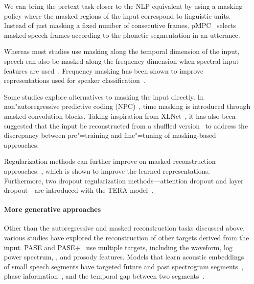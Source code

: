 We can bring the pretext task closer to the NLP equivalent by using a masking policy where the masked regions of the input correspond to linguistic units. Instead of just masking a fixed number of consecutive frames, pMPC~\parencite{yue_phonetically_2021} selects masked speech frames according to the phonetic segmentation in an utterance. 

Whereas most studies use masking along the temporal dimension of the input, speech can also be masked along the frequency dimension when spectral input features are used~\parencite{wang_unsupervised_2020,liu_tera_2021}. Frequency masking has been shown to improve representations used for speaker classification~\parencite{liu_tera_2021}. 

Some studies explore alternatives to masking the input directly. In non"autoregressive predictive coding (NPC)~\parencite{liu_nonautoregressive_2020}, time masking is introduced through masked convolution blocks. Taking inspiration from XLNet~\parencite{yang_xlnet_2019}, it has also been suggested that the input be reconstructed from a shuffled version~\parencite{song_speechxlnet_2020} to address the discrepancy between pre"=training and fine"=tuning of masking-based approaches.

Regularization methods can further improve on masked reconstruction approaches. , which is shown to improve the learned representations. Furthermore, two dropout regularization methods---attention dropout and layer dropout---are introduced with the TERA model~\parencite{liu_tera_2021, luo_dropout_2021}. 

\paragraph{More generative approaches}
Other than the autoregressive and masked reconstruction tasks discussed above, various studies have explored the reconstruction of other targets derived from the input. PASE and PASE+~\parencite{pascual_learning_2019,ravanelli_multitask_2020} use multiple targets, including the waveform, log power spectrum, , and prosody features. Models that learn acoustic embeddings of small speech segments have targeted future and past spectrogram segments~\parencite{chung_speech2vec_2018, tagliasacchi_selfsupervised_2019, tagliasacchi_pretraining_2020}, phase information~\parencite{quitry_learning_2019}, and the temporal gap between two segments~\parencite{tagliasacchi_selfsupervised_2019, tagliasacchi_pretraining_2020}.


